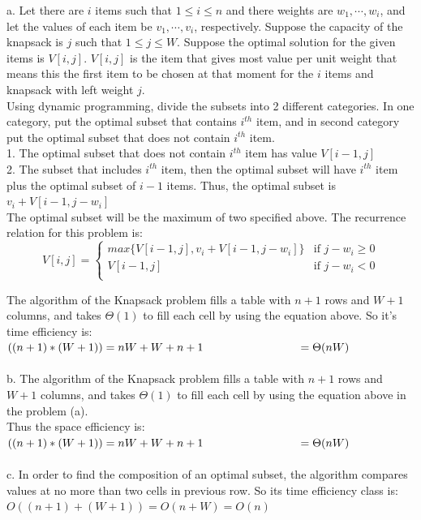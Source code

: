 \documentclass{article}
\begin{document}
a. Let there are $i$ items such that $1 \le i \le n$ and there weights are $w_1, \cdots, w_i$, and let the values of each item be $v_1, \cdots, v_i$, respectively. Suppose the capacity of the knapsack is $j$ such that $1 \le j \le W$. Suppose the optimal solution for the given items is $V[i,j]$. $V[i,j]$ is the item that gives most value per unit weight that means this the first item to be chosen at that moment for the $i$ items and knapsack with left weight $j$. \\
Using dynamic programming, divide the subsets into 2 different categories. In one category, put the optimal subset that contains $i^{th}$ item, and in second category put the optimal subset that does not contain $i^{th}$ item. \\
1. The optimal subset that does not contain $i^{th}$ item has value $V[i-1, j]$ \\
2. The subset that includes $i^{th}$ item, then the optimal subset will have $i^{th}$ item plus the optimal subset of $i-1$ items. Thus, the optimal subset is $v_i + V[i-1, j-w_i]$ \\
The optimal subset will be the maximum of two specified above. 
The recurrence relation for this problem is: \\
\begin{equation}
  V[i,j] =
    \begin{cases}
      max\{V[i-1, j], v_i + V[i-1, j-w_i]\} & \text{if $j-w_i \ge 0$} \\
      V[i-1, j] & \text{if $j-w_i < 0$}\\
    \end{cases}       
\end{equation}

The algorithm of the Knapsack problem fills a table with $n+1$ rows and $W+1$ columns, and takes $\Theta(1)$ to fill each cell by using the equation above. So it's time efficiency is: \\
$((n+1) * (W+1)) = nW + W + n + 1 \\
\indent \indent \indent \indent \indent \; \;  \; = \Theta(nW)$ \\ \\
\indent b. The algorithm of the Knapsack problem fills a table with $n+1$ rows and $W+1$ columns, and takes $\Theta(1)$ to fill each cell by using the equation above in the problem (a). \\
Thus the space efficiency is: \\
$((n+1) * (W+1)) = nW + W + n + 1 \\
\indent \indent \indent \indent \indent \; \;  \; = \Theta(nW)$ \\ \\
\indent c. In order to find the composition of an optimal subset, the algorithm compares values at no more than two cells in previous row. So its time efficiency class is: $O((n+1) + (W+1)) = O(n+W) = O(n)$
\end{document}
